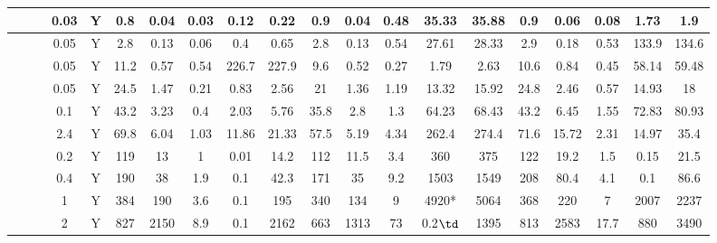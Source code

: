 \begin{table*}[t]
\begin{tabular}{!{\vrule width 1pt} c | c | c | c | c !{\vrule width 1pt} c | c | c | c | c !{\vrule width 1pt} c | c | c | c | c !{\vrule width 1pt} c | c | c | c | c !{\vrule width 1pt}}
{}  &  &  & 0.03 & Y & 0.8  & 0.04   & 0.03  & 0.12  & 0.22  & 0.9   & 0.04  & 0.48 & 35.33    & 35.88 & 0.9  & 0.06 & 0.08 & 1.73  & 1.9   \\ \hline
{} &  &  & 0.05 & Y & 2.8  & 0.13   & 0.06  & 0.4   & 0.65  & 2.8   & 0.13  & 0.54 & 27.61    & 28.33 & 2.9  & 0.18 & 0.53 & 133.9 & 134.6 \\ \hline
{} &  &  & 0.05 & Y & 11.2 & 0.57   & 0.54  & 226.7 & 227.9 & 9.6   & 0.52  & 0.27 & 1.79     & 2.63  & 10.6 & 0.84 & 0.45 & 58.14 & 59.48 \\ \hline
{} &  &  & 0.05 & Y & 24.5 & 1.47   & 0.21  & 0.83  & 2.56  & 21    & 1.36  & 1.19 & 13.32    & 15.92 & 24.8 & 2.46 & 0.57 & 14.93 & 18    \\ \hline
{} &  &  & 0.1  & Y & 43.2 & 3.23   & 0.4   & 2.03  & 5.76  & 35.8  & 2.8   & 1.3  & 64.23    & 68.43 & 43.2 & 6.45 & 1.55 & 72.83 & 80.93 \\ \hline
{} &  &  & 2.4  & Y & 69.8 & 6.04   & 1.03  & 11.86 & 21.33 & 57.5  & 5.19  & 4.34 & 262.4    & 274.4 & 71.6 & 15.72& 2.31 & 14.97 & 35.4  \\ \hline
{} &  &  & 0.2  & Y & 119  & 13     & 1     & 0.01  & 14.2  & 112   & 11.5  & 3.4  & 360      & 375   & 122  & 19.2 & 1.5  & 0.15  & 21.5  \\ \hline
{} &  &  & 0.4  & Y & 190  & 38     & 1.9   & 0.1   & 42.3  & 171   & 35    & 9.2  & 1503     & 1549  & 208  & 80.4 & 4.1  & 0.1   & 86.6  \\ \hline
{} &  &  & 1    & Y & 384  & 190    & 3.6   & 0.1   & 195   & 340   & 134   & 9    & 4920*    & 5064  & 368  & 220  & 7    & 2007  & 2237  \\ \hline
{} &  &  & 2    & Y & 827  & 2150   & 8.9   & 0.1   & 2162  & 663   & 1313  & 73   & 0.2$\td$ & 1395  & 813  & 2583 & 17.7 & 880   & 3490  \\ \hline\hline

\end{tabular}
\end{table*}
